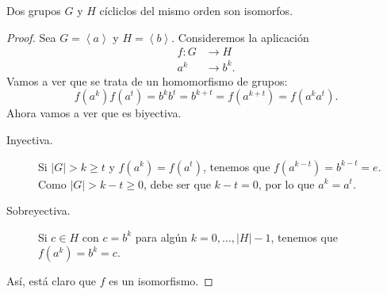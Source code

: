 \begin{prop}
Dos grupos $\displaystyle G $ y $\displaystyle H $ cícliclos del mismo orden son isomorfos.
\end{prop}
\begin{proof}
Sea $\displaystyle G = \left\langle a \right\rangle  $ y $\displaystyle H = \left\langle b \right\rangle  $. Consideremos la aplicación
\[
\begin{split}
	f : G & \to H \\
	a^{k} & \to b^{k}.
\end{split}
\]
Vamos a ver que se trata de un homomorfismo de grupos:
\[f\left(a^{k}\right)f\left(a^{t}\right) = b^{k}b^{t} = b^{k+t} = f\left(a^{k+t}\right) = f\left(a^{k}a^{t}\right) .\]
Ahora vamos a ver que es biyectiva. 
\begin{description}
\item[Inyectiva.] Si $\displaystyle \left|G\right| > k \geq t $ y $\displaystyle f\left(a^{k}\right) = f\left(a^{t}\right) $, tenemos que $\displaystyle f\left(a^{k-t}\right) = b^{k -t} = e $. Como $\displaystyle \left|G\right|>k - t \geq 0 $, debe ser que $\displaystyle k - t = 0 $, por lo que $\displaystyle a^{k} = a^{t} $.
\item[Sobreyectiva.]  Si $\displaystyle c \in H $ con $\displaystyle c = b^{k} $ para algún $\displaystyle k = 0, \ldots, \left|H\right|-1 $, tenemos que $\displaystyle f\left(a^{k}\right)= b^{k} = c $.
\end{description}
Así, está claro que $\displaystyle f $ es un isomorfismo.
\end{proof}

